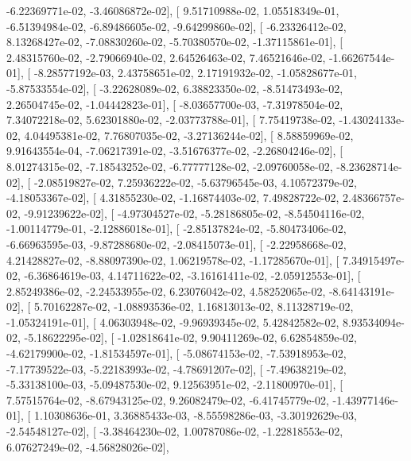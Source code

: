 \documentclass{article}
\begin{document}
         -6.22369771e-02,  -3.46086872e-02],
       [  9.51710988e-02,   1.05518349e-01,  -6.51394984e-02,
         -6.89486605e-02,  -9.64299860e-02],
       [ -6.23326412e-02,   8.13268427e-02,  -7.08830260e-02,
         -5.70380570e-02,  -1.37115861e-01],
       [  2.48315760e-02,  -2.79066940e-02,   2.64526463e-02,
          7.46521646e-02,  -1.66267544e-01],
       [ -8.28577192e-03,   2.43758651e-02,   2.17191932e-02,
         -1.05828677e-01,  -5.87533554e-02],
       [ -3.22628089e-02,   6.38823350e-02,  -8.51473493e-02,
          2.26504745e-02,  -1.04442823e-01],
       [ -8.03657700e-03,  -7.31978504e-02,   7.34072218e-02,
          5.62301880e-02,  -2.03773788e-01],
       [  7.75419738e-02,  -1.43024133e-02,   4.04495381e-02,
          7.76807035e-02,  -3.27136244e-02],
       [  8.58859969e-02,   9.91643554e-04,  -7.06217391e-02,
         -3.51676377e-02,  -2.26804246e-02],
       [  8.01274315e-02,  -7.18543252e-02,  -6.77777128e-02,
         -2.09760058e-02,  -8.23628714e-02],
       [ -2.08519827e-02,   7.25936222e-02,  -5.63796545e-03,
          4.10572379e-02,  -4.18053367e-02],
       [  4.31855230e-02,  -1.16874403e-02,   7.49828722e-02,
          2.48366757e-02,  -9.91239622e-02],
       [ -4.97304527e-02,  -5.28186805e-02,  -8.54504116e-02,
         -1.00114779e-01,  -2.12886018e-01],
       [ -2.85137824e-02,  -5.80473406e-02,  -6.66963595e-03,
         -9.87288680e-02,  -2.08415073e-01],
       [ -2.22958668e-02,   4.21428827e-02,  -8.88097390e-02,
          1.06219578e-02,  -1.17285670e-01],
       [  7.34915497e-02,  -6.36864619e-03,   4.14711622e-02,
         -3.16161411e-02,  -2.05912553e-01],
       [  2.85249386e-02,  -2.24533955e-02,   6.23076042e-02,
          4.58252065e-02,  -8.64143191e-02],
       [  5.70162287e-02,  -1.08893536e-02,   1.16813013e-02,
          8.11328719e-02,  -1.05324191e-01],
       [  4.06303948e-02,  -9.96939345e-02,   5.42842582e-02,
          8.93534094e-02,  -5.18622295e-02],
       [ -1.02818641e-02,   9.90411269e-02,   6.62854859e-02,
         -4.62179900e-02,  -1.81534597e-01],
       [ -5.08674153e-02,  -7.53918953e-02,  -7.17739522e-03,
         -5.22183993e-02,  -4.78691207e-02],
       [ -7.49638219e-02,  -5.33138100e-03,  -5.09487530e-02,
          9.12563951e-02,  -2.11800970e-01],
       [  7.57515764e-02,  -8.67943125e-02,   9.26082479e-02,
         -6.41745779e-02,  -1.43977146e-01],
       [  1.10308636e-01,   3.36885433e-03,  -8.55598286e-03,
         -3.30192629e-03,  -2.54548127e-02],
       [ -3.38464230e-02,   1.00787086e-02,  -1.22818553e-02,
          6.07627249e-02,  -4.56828026e-02],
\end{document}
